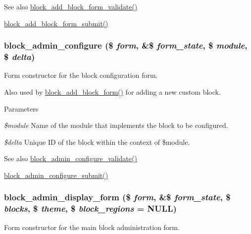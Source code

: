 \begin{DoxySeeAlso}{See also}
\hyperlink{block_8admin_8inc_a01e910bd6f2a2cab75dde1db2df7af9b}{block\_\-add\_\-block\_\-form\_\-validate()} 

\hyperlink{block_8admin_8inc_ab1b62b97e79a16ab5a83cc746429601d}{block\_\-add\_\-block\_\-form\_\-submit()} 
\end{DoxySeeAlso}
\hypertarget{group__forms_ga0efaf6e043d69e3fe4f596341f6f90e2}{
\subsubsection[{block\_\-admin\_\-configure}]{\setlength{\rightskip}{0pt plus 5cm}block\_\-admin\_\-configure (\$ {\em form}, \/  \&\$ {\em form\_\-state}, \/  \$ {\em module}, \/  \$ {\em delta})}}
\label{group__forms_ga0efaf6e043d69e3fe4f596341f6f90e2}
Form constructor for the block configuration form.

Also used by \hyperlink{group__forms_ga974d0d9820f12e9a2ce5ae328d0ccdc5}{block\_\-add\_\-block\_\-form()} for adding a new custom block.


\begin{DoxyParams}{Parameters}
\item[{\em \$module}]Name of the module that implements the block to be configured. \item[{\em \$delta}]Unique ID of the block within the context of \$module.\end{DoxyParams}
\begin{DoxySeeAlso}{See also}
\hyperlink{block_8admin_8inc_a5c45bd363e4fcbacea89a31e60215b47}{block\_\-admin\_\-configure\_\-validate()} 

\hyperlink{block_8admin_8inc_a5f23480eb6a76d82ab516f09baaa2318}{block\_\-admin\_\-configure\_\-submit()} 
\end{DoxySeeAlso}
\hypertarget{group__forms_ga19dc9d98e83e7e7c9574298100752ba7}{
\subsubsection[{block\_\-admin\_\-display\_\-form}]{\setlength{\rightskip}{0pt plus 5cm}block\_\-admin\_\-display\_\-form (\$ {\em form}, \/  \&\$ {\em form\_\-state}, \/  \$ {\em blocks}, \/  \$ {\em theme}, \/  \$ {\em block\_\-regions} = {\ttfamily NULL})}}
\label{group__forms_ga19dc9d98e83e7e7c9574298100752ba7}
Form constructor for the main block administration form.


